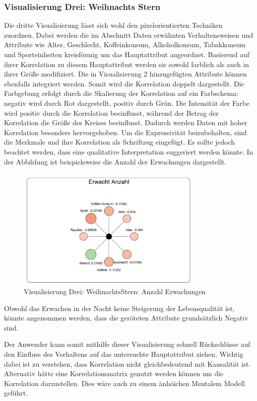 \documentclass[usegeometry=true]{scrartcl}
\begin{document}
\subsubsection{Visualisierung Drei: Weihnachts Stern} 
Die dritte Visualisierung lässt sich wohl den pixelorientierten Techniken zuordnen. Dabei werden die im Abschnitt Daten erwähnten Verhaltensweisen und Attribute wie Alter, Geschlecht, Koffeinkonsum, Alkoholkonsum, Tabakkonsum und Sporteinheiten kreisförmig um das Hauptattribut angeordnet. Basierend auf ihrer Korrelation zu diesem Hauptattribut werden sie sowohl farblich als auch in ihrer Größe modifiziert. Die in Visualisierung 2 hinzugefügten Attribute können ebenfalls integriert werden. Somit wird die Korrelation doppelt dargestellt. Die Farbgebung erfolgt durch die Skalierung der Korrelation auf ein Farbschema: negativ wird durch Rot dargestellt, positiv durch Grün. Die Intensität der Farbe wird positiv durch die Korrelation beeinflusst, während der Betrag der Korrelation die Größe des Kreises beeinflusst. Dadurch werden Daten mit hoher Korrelation besonders hervorgehoben. Um die Expressivität beizubehalten, sind die Merkmale und ihre Korrelation als Schriftzug eingefügt. Es sollte jedoch beachtet werden, dass eine qualitative Interpretation suggeriert werden könnte. In der Abbildung ist beispielsweise die Anzahl der Erwachungen dargestellt.

\begin{figure}[h]
  \centering
  \includegraphics[width = 0.8\textwidth]{WeihnachtsStern.JPG}
  \caption{Visualisierung Drei: WeihnachtsStern: Anzahl Erwachungen }
\end{figure}

Obwohl das Erwachen in der Nacht keine Steigerung der Lebensqualität ist, könnte angenommen werden, dass die geröteten Attribute grundsätzlich Negativ sind.

Der Anwender kann somit mithilfe dieser Visualisierung schnell Rückschlüsse auf den Einfluss des Verhaltens auf das untersuchte Hauptattribut ziehen. Wichtig dabei ist zu verstehen, dass Korrelation nicht gleichbedeutend mit Kausalität ist.
Alternativ hätte eine Korrelationsmatrix genutzt werden können um die Korrelation darzustellen. Dies wäre auch zu einem änhöichen Mentalem Modell geführt.
\end{document}
